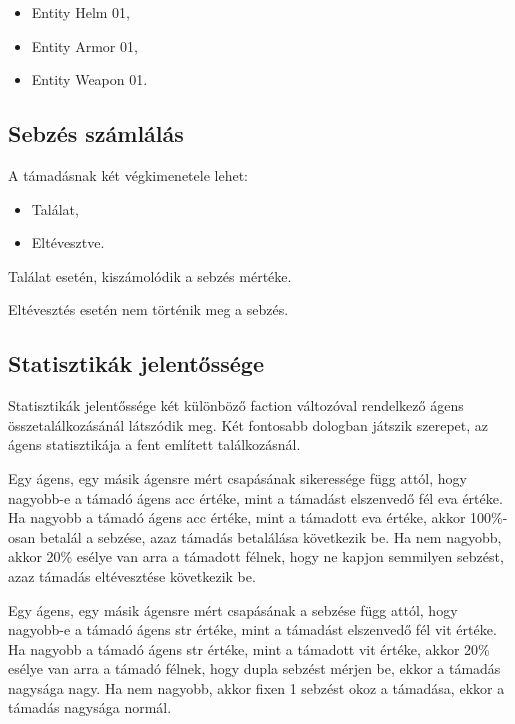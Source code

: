 \begin{itemize}
    \item Entity Helm 01,
    \item Entity Armor 01,
    \item Entity Weapon 01.
\end{itemize}

\subsection{Sebzés számlálás}

\label{számlálás}

A támadásnak két végkimenetele lehet:

\begin{itemize}
    \item Találat,
    \item Eltévesztve.
\end{itemize}

\noindent Találat esetén, kiszámolódik a sebzés mértéke. 

\noindent Eltévesztés esetén nem történik meg a sebzés. 

\subsection{Statisztikák jelentőssége}

Statisztikák jelentőssége két különböző faction változóval rendelkező ágens összetalálkozásánál látszódik meg.
Két fontosabb dologban játszik szerepet, az ágens statisztikája a fent említett találkozásnál.

Egy ágens, egy másik ágensre mért csapásának sikeressége függ attól, hogy nagyobb-e a támadó ágens acc értéke, mint a támadást elszenvedő fél eva értéke.
Ha nagyobb a támadó ágens acc értéke, mint a támadott eva értéke, akkor 100\%-osan betalál a sebzése, azaz támadás betalálása következik be.
Ha nem nagyobb, akkor 20\% esélye van arra a támadott félnek, hogy ne kapjon semmilyen sebzést, azaz támadás eltévesztése következik be.

Egy ágens, egy másik ágensre mért csapásának a sebzése függ attól, hogy nagyobb-e a támadó ágens str értéke, mint a támadást elszenvedő fél vit értéke.
Ha nagyobb a támadó ágens str értéke, mint a támadott vit értéke, akkor 20\% esélye van arra a támadó félnek, hogy dupla sebzést mérjen be, ekkor a támadás nagysága nagy.
Ha nem nagyobb, akkor fixen 1 sebzést okoz a támadása, ekkor a támadás nagysága normál.

